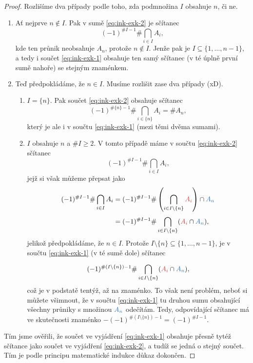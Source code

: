 \begin{proof}
 Rozlišíme dva případy podle toho, zda podmnožina $I$ obsahuje $n$, či ne.
 \begin{enumerate}[label=(\alph*)]
  \item Ať nejprve $n \notin I$. Pak v sumě \eqref{eq:ink-exk-2} je sčítanec
   \[
    (-1)^{\# I-1} \# \bigcap_{i \in  I}^{} A_i,
   \]
   kde ten průnik neobsahuje $A_n$, protože $n \notin I$. Jenže pak je $I
   \subseteq \{1,\ldots,n-1\}$, a tedy i součet \eqref{eq:ink-exk-1} obsahuje
   ten samý sčítanec (v té úplně první sumě nahoře) se stejným znaménkem.
  \item Teď předpokládáme, že $n \in I$. Musíme rozlišit zase dva případy (xD).
   \begin{enumerate}[label=(\greek*)]
    \item $I = \{n\}$. Pak součet \eqref{eq:ink-exk-2} obsahuje sčítanec
     \[
      (-1)^{\#\{n\}-1} \# \bigcap_{i \in \{n\}}^{} A_i = \# A_n,
     \]
     který je ale i v součtu \eqref{eq:ink-exk-1} (mezi těmi dvěma sumami).
    \item $I$ obsahuje $n$ a $\# I \geq 2$. V tomto případě máme v součtu
     \eqref{eq:ink-exk-2} sčítanec
     \[
      (-1)^{\# I - 1} \# \bigcap_{i \in I}^{} A_i,
     \]
     jejž si však můžeme přepsat jako
     \begin{align*}
      (-1)^{\# I - 1} \# \bigcap_{i \in I}^{} A_i &= (-1)^{\# I - 1} \#
      \left(\bigcap_{i \in  I \setminus \{n\}}^{} \clr{A_i}\right) \cap
      \clb{A_n}\\
      &= (-1)^{\# I - 1} \# \bigcap_{i  \in I \setminus \{n\}}^{} (\clr{A_i}
      \cap \clb{A_n}),
     \end{align*}
     jelikož předpokládáme, že $n \in I$. Protože $I \setminus \{n\} \subseteq
     \{1,\ldots,n-1\}$, je v součtu \eqref{eq:ink-exk-1} (v té sumě dole)
     sčítanec
     \[
     (-1)^{\#(I \setminus \{n\}) - 1} \# \bigcap_{i  \in I \setminus \{n\}}^{}
     (\clr{A_i} \cap \clb{A_n}),
     \]
     což je v podstatě tentýž, až na znaménko. To však není problém, neboť si
     můžete všimnout, že v součtu \eqref{eq:ink-exk-1} tu druhou sumu obsahující
     všechny průniky s množinou $\clb{A_n}$ odečítám. Tedy, odpovídající
     sčítanec má ve skutečnosti znaménko $-(-1)^{\# (I \setminus \{n\})-1} =
     (-1)^{\# I - 1}$.
   \end{enumerate}
 \end{enumerate}
 Tím jsme ověřili, že součet ve vyjádření \eqref{eq:ink-exk-1} obsahuje přesně
 tytéž sčítance jako součet ve vyjádření \eqref{eq:ink-exk-2}, a tudíž se jedná
 o stejný součet. Tím je podle principu matematické indukce důkaz dokončen.
\end{proof}

